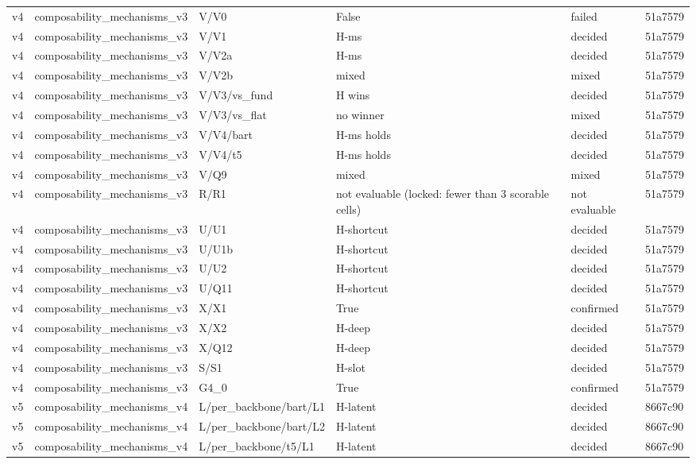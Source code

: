 \begin{longtable}{llllll}
v4 & composability\_mechanisms\_v3 & V/V0 & False & failed & 51a7579 \\
v4 & composability\_mechanisms\_v3 & V/V1 & H-ms & decided & 51a7579 \\
v4 & composability\_mechanisms\_v3 & V/V2a & H-ms & decided & 51a7579 \\
v4 & composability\_mechanisms\_v3 & V/V2b & mixed & mixed & 51a7579 \\
v4 & composability\_mechanisms\_v3 & V/V3/vs\_fund & H wins & decided & 51a7579 \\
v4 & composability\_mechanisms\_v3 & V/V3/vs\_flat & no winner & mixed & 51a7579 \\
v4 & composability\_mechanisms\_v3 & V/V4/bart & H-ms holds & decided & 51a7579 \\
v4 & composability\_mechanisms\_v3 & V/V4/t5 & H-ms holds & decided & 51a7579 \\
v4 & composability\_mechanisms\_v3 & V/Q9 & mixed & mixed & 51a7579 \\
v4 & composability\_mechanisms\_v3 & R/R1 & not evaluable (locked: fewer than 3 scorable cells) & not evaluable & 51a7579 \\
v4 & composability\_mechanisms\_v3 & U/U1 & H-shortcut & decided & 51a7579 \\
v4 & composability\_mechanisms\_v3 & U/U1b & H-shortcut & decided & 51a7579 \\
v4 & composability\_mechanisms\_v3 & U/U2 & H-shortcut & decided & 51a7579 \\
v4 & composability\_mechanisms\_v3 & U/Q11 & H-shortcut & decided & 51a7579 \\
v4 & composability\_mechanisms\_v3 & X/X1 & True & confirmed & 51a7579 \\
v4 & composability\_mechanisms\_v3 & X/X2 & H-deep & decided & 51a7579 \\
v4 & composability\_mechanisms\_v3 & X/Q12 & H-deep & decided & 51a7579 \\
v4 & composability\_mechanisms\_v3 & S/S1 & H-slot & decided & 51a7579 \\
v4 & composability\_mechanisms\_v3 & G4\_0 & True & confirmed & 51a7579 \\
v5 & composability\_mechanisms\_v4 & L/per\_backbone/bart/L1 & H-latent & decided & 8667c90 \\
v5 & composability\_mechanisms\_v4 & L/per\_backbone/bart/L2 & H-latent & decided & 8667c90 \\
v5 & composability\_mechanisms\_v4 & L/per\_backbone/t5/L1 & H-latent & decided & 8667c90 \\

\end{longtable}
